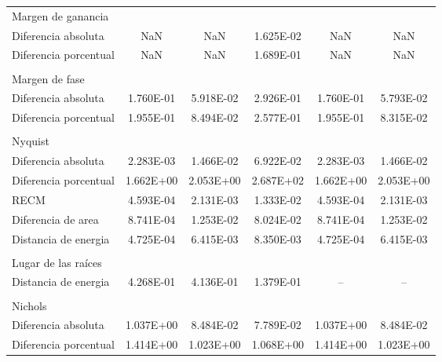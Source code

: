{\begin{longtable}{l @{\extracolsep{\fill}} ccccc}
            Margen de ganancia &  &  &  &  &  \\ \cmidrule{1-1}
            Diferencia absoluta          & NaN & NaN & \num{1.625E-02} & NaN & NaN  \\
            Diferencia porcentual        & NaN & NaN & \num{1.689E-01} & NaN & NaN  \\
            & & & & & \\
            Margen de fase  &  &  &  &  &  \\ \cmidrule{1-1}
            Diferencia absoluta          & \num{1.760E-01} & \num{5.918E-02} & \num{2.926E-01} & \num{1.760E-01} & \num{5.793E-02}  \\
            Diferencia porcentual        & \num{1.955E-01} & \num{8.494E-02} & \num{2.577E-01} & \num{1.955E-01} & \num{8.315E-02}  \\
            & & & & & \\
            Nyquist  &  &  &  &  &  \\ \cmidrule{1-1}
            Diferencia absoluta          & \num{2.283E-03} & \num{1.466E-02} & \num{6.922E-02} & \num{2.283E-03} & \num{1.466E-02}  \\
            Diferencia porcentual        & \num{1.662E+00} & \num{2.053E+00} & \num{2.687E+02} & \num{1.662E+00} & \num{2.053E+00}  \\
            RECM                         & \num{4.593E-04} & \num{2.131E-03} & \num{1.333E-02} & \num{4.593E-04} & \num{2.131E-03}  \\
            Diferencia de area           & \num{8.741E-04} & \num{1.253E-02} & \num{8.024E-02} & \num{8.741E-04} & \num{1.253E-02}  \\
            Distancia de energia         & \num{4.725E-04} & \num{6.415E-03} & \num{8.350E-03} & \num{4.725E-04} & \num{6.415E-03}  \\
            & & & & & \\
            Lugar de las raíces  &  &  &  &  &  \\ \cmidrule{1-1}
            Distancia de energia         & \num{4.268E-01} & \num{4.136E-01} & \num{1.379E-01} & -- & --  \\
            & & & & & \\
            Nichols &  &  &  &  &  \\ \cmidrule{1-1}
            Diferencia absoluta          & \num{1.037E+00} & \num{8.484E-02} & \num{7.789E-02} & \num{1.037E+00} & \num{8.484E-02}  \\
            Diferencia porcentual        & \num{1.414E+00} & \num{1.023E+00} & \num{1.068E+00} & \num{1.414E+00} & \num{1.023E+00}  \\

\end{longtable}}
